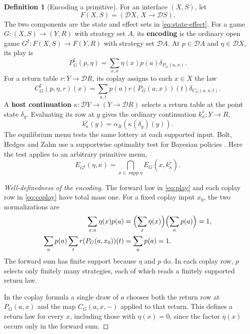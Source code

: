 \documentclass[11pt,a4paper]{article}
\theoremstyle{definition}
\newtheorem{definition}[theorem]{Definition}
\newcommand{\D}{\mathcal D}
\newcommand{\supp}{\operatorname{supp}}
\begin{document}
\begin{definition}[Encoding a primitive]\label{def:encode}
    For an interface $(X,S)$, let
    \[
        F(X,S)=(\D X,\,X\to\D S).
    \]
    The two components are the state and effect sets in \eqref{eq:state-effect}. For a game $G:(X,S)\to(Y,R)$ with strategy set $A$, its \textbf{encoding} is the ordinary open game $G^\sharp:F(X,S)\to F(Y,R)$ with strategy set $\D A$. At $p\in\D A$ and $\eta\in\D X$, its play is
    \begin{equation}
        P^\sharp_G(p,\eta)=\sum_{x,a}\eta(x)p(a)\delta_{P_G(a,x)}.
        \label{eq:play}
    \end{equation}
    For a return table $r:Y\to\D R$, its coplay assigns to each $x\in X$ the law
    \begin{equation}
        C^\sharp_G(p,\eta,r)(x)=\sum_{a,t}p(a)r(P_G(a,x))(t)\delta_{C_G(a,x,t)}.
        \label{eq:coplay}
    \end{equation}
    A \textbf{host continuation} $\kappa:\D Y\to(Y\to\D R)$ selects a return table at the point state $\delta_y$. Evaluating its row at $y$ gives the ordinary continuation $k^\flat_\kappa:Y\to R$,
    \begin{equation}
        k^\flat_\kappa(y)=\alpha_R(\kappa(\delta_y)(y)).
        \label{eq:flat}
    \end{equation}
    The equilibrium menu tests the same lottery at each supported input. Bolt, Hedges and Zahn use a supportwise optimality test for Bayesian policies \cite[Definition~4.4.1]{bolt}. Here the test applies to an arbitrary primitive menu,
    \begin{equation}
        E_{G^\sharp}(\eta,\kappa)=\bigcap_{x\in\supp\eta}E_G(x,k^\flat_\kappa).
        \label{eq:common}
    \end{equation}
\end{definition}
\begin{proof}[Well-definedness of the encoding]
    The forward law in \eqref{eq:play} and each coplay row in \eqref{eq:coplay} have total mass one. For a fixed coplay input $x_0$, the two normalizations are
    \[
        \begin{aligned}
            \sum_{x,a}\eta(x)p(a)
            &= \Bigl(\sum_x\eta(x)\Bigr)\Bigl(\sum_a p(a)\Bigr)=1,\\
            \sum_a p(a)\sum_t r(P_G(a,x_0))(t)
            &= \sum_a p(a)=1 .
        \end{aligned}
    \]
    The forward sum has finite support because $\eta$ and $p$ do. In each coplay row, $p$ selects only finitely many strategies, each of which reads a finitely supported return law.

    In the coplay formula a single draw of $a$ chooses both the return row at $P_G(a,x)$ and the map $C_G(a,x,-)$ applied to that return. This defines a return law for every $x$, including those with $\eta(x)=0$, since the factor $\eta(x)$ occurs only in the forward sum.
\end{proof}
\end{document}
